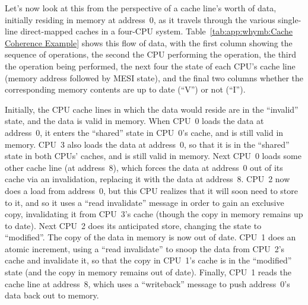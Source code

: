 Let's now look at this from the perspective of a cache line's worth
of data, initially residing in memory at address~0,
as it travels through the various single-line direct-mapped caches
in a four-CPU system.
Table~\ref{tab:app:whymb:Cache Coherence Example}
shows this flow of data, with the first column showing the sequence
of operations, the second the CPU performing the operation,
the third the operation being performed, the next four the state
of each CPU's cache line (memory address followed by MESI state),
and the final two columns whether the corresponding memory contents
are up to date (``V'') or not (``I'').

Initially, the CPU cache lines in which the data would reside are
in the ``invalid'' state, and the data is valid in memory.
When CPU~0 loads the data at address~0, it enters the ``shared'' state in
CPU~0's cache, and is still valid in memory.
CPU~3 also loads the data at address~0, so that it is in the
``shared'' state in both CPUs' caches, and is still valid in memory.
Next CPU~0 loads some other cache line (at address~8),
which forces the data at address~0 out of its cache via an invalidation,
replacing it with the data at address~8.
CPU~2 now does a load from address~0, but this CPU realizes that it will
soon need to store to it, and so it uses a ``read invalidate'' message
in order to gain an exclusive copy, invalidating
it from CPU~3's cache (though the copy in memory remains up to date).
Next CPU~2 does its anticipated store, changing the state to ``modified''.
The copy of the data in memory is now out of date.
CPU~1 does an atomic increment, using a ``read invalidate'' to snoop
the data from CPU~2's cache
and invalidate it, so that the copy in CPU~1's cache is in the ``modified''
state (and the copy in memory remains out of date).
Finally, CPU~1 reads the cache line at address~8, which uses a
``writeback'' message to push address~0's data back out to memory.


